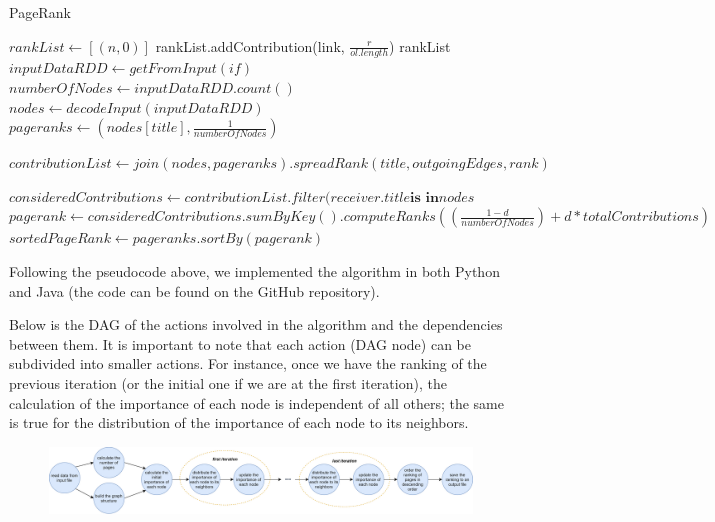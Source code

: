 \begin{algorithm}[H]
	\caption{PageRank}\label{General}
		\begin{algorithmic}[1]
			
				\State $rankList \gets [(n, 0)]$
						\State rankList.addContribution(link, $\frac{r}{ol.length}$)
					\EndFor
				\EndIf
				\State \Return rankList
			\EndProcedure		
\newline
				\State $inputDataRDD \gets getFromInput(if)$
				\State $numberOfNodes \gets inputDataRDD.count()$
				\State $nodes \gets decodeInput(inputDataRDD)$
				\State $pageranks \gets (nodes[title], \frac{1}{numberOfNodes})$
				
					\State $contributionList \gets join(nodes, pageranks).spreadRank(title, outgoingEdges, rank)$
		
					\State $consideredContributions \gets contributionList.filter(receiver.title  \textbf{is in}  nodes$
					\State $pagerank \gets consideredContributions.sumByKey().computeRanks((\frac{1 - d}{numberOfNodes}) + d*totalContributions)$
				\EndFor
				\State $sortedPageRank \gets pageranks.sortBy(pagerank)$
			\EndProcedure
	\end{algorithmic}
\end{algorithm}

Following the pseudocode above, we implemented the algorithm in both Python and Java (the code can be found on the GitHub repository).

\noindent Below is the DAG of the actions involved in the algorithm and the dependencies between them. It is important to note that each action (DAG node) can be subdivided into smaller actions. For instance, once we have the ranking of the previous iteration (or the initial one if we are at the first iteration), the calculation of the importance of each node is independent of all others; the same is true for the distribution of the importance of each node to its neighbors.

\begin{figure}[H]
	\includegraphics[width=\textwidth]{img/dag.png}
	\label{fig:parsingPhase}     
\end{figure}

